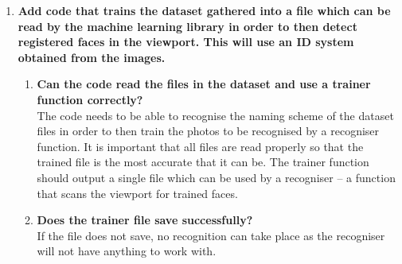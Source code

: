 \documentclass[9pt]{article}
\begin{document}
\begin{small}
\begin{enumerate}
		\item \textbf{Add code that trains the dataset gathered into a file which can be read by the machine learning library in order to then detect registered faces in the viewport. This will use an ID system obtained from the images.}
		\begin{enumerate}
			\item \textbf{Can the code read the files in the dataset and use a trainer function correctly?}\\
				The code needs to be able to recognise the naming scheme of the dataset files in order to then train the photos to be recognised by a recogniser function. It is important that all files are read properly so that the trained file is the most accurate that it can be. The trainer function should output a single file which can be used by a recogniser – a function that scans the viewport for trained faces.
			\item \textbf{Does the trainer file save successfully?}\\
				If the file does not save, no recognition can take place as the recogniser will not have anything to work with.
		\end{enumerate}


\end{enumerate}
\end{small}
\end{document}

